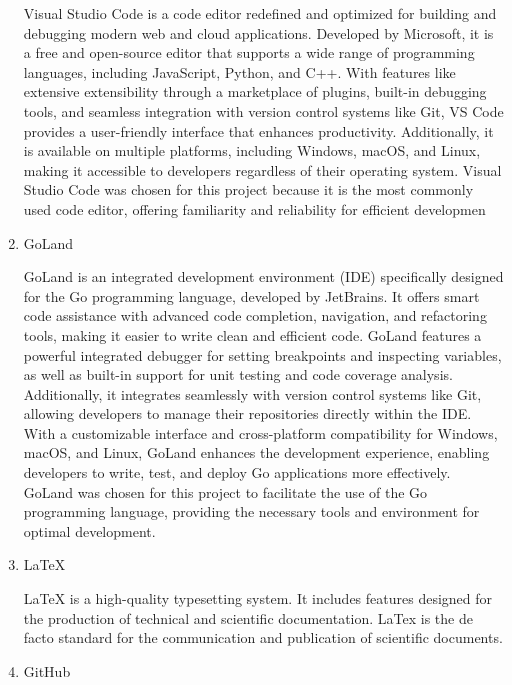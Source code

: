 \documentclass[conference]{IEEEtran}
\begin{document}
\begin{enumerate}[itemsep=2ex, parsep=1ex]
	      	      
	      Visual Studio Code is a code editor redefined and optimized for building and debugging modern web and cloud applications. Developed by Microsoft, it is a free and open-source editor that supports a wide range of programming languages, including JavaScript, Python, and C++. With features like extensive extensibility through a marketplace of plugins, built-in debugging tools, and seamless integration with version control systems like Git, VS Code provides a user-friendly interface that enhances productivity. Additionally, it is available on multiple platforms, including Windows, macOS, and Linux, making it accessible to developers regardless of their operating system. Visual Studio Code was chosen for this project because it is the most commonly used code editor, offering familiarity and reliability for efficient developmen
	      	      
	\item GoLand
	      	      
	      	      
	      GoLand is an integrated development environment (IDE) specifically designed for the Go programming language, developed by JetBrains. It offers smart code assistance with advanced code completion, navigation, and refactoring tools, making it easier to write clean and efficient code. GoLand features a powerful integrated debugger for setting breakpoints and inspecting variables, as well as built-in support for unit testing and code coverage analysis. Additionally, it integrates seamlessly with version control systems like Git, allowing developers to manage their repositories directly within the IDE. With a customizable interface and cross-platform compatibility for Windows, macOS, and Linux, GoLand enhances the development experience, enabling developers to write, test, and deploy Go applications more effectively. GoLand was chosen for this project to facilitate the use of the Go programming language, providing the necessary tools and environment for optimal development.
	      	      
	\item LaTeX
	      	      
	      	      
	      LaTeX is a high-quality typesetting system. It includes features designed for the production of technical and scientific documentation. LaTex is the de facto standard for the communication and publication of scientific documents.
	      	      
	\item GitHub
	      	      

\end{enumerate}
\end{document}
